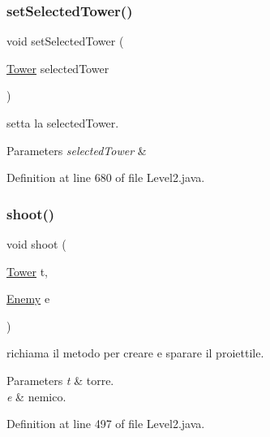 \subsubsection{\texorpdfstring{set\+Selected\+Tower()}{setSelectedTower()}}
{\footnotesize\ttfamily void set\+Selected\+Tower (\begin{DoxyParamCaption}\item[{\hyperlink{classtowers_1_1_tower}{Tower}}]{selected\+Tower }\end{DoxyParamCaption})}



setta la selected\+Tower. 


\begin{DoxyParams}{Parameters}
{\em selected\+Tower} & \\
\hline
\end{DoxyParams}


Definition at line 680 of file Level2.\+java.

\mbox{\label{classscenes_1_1_level2_a200b073564fc341f34b6112718742bae}} 
\subsubsection{\texorpdfstring{shoot()}{shoot()}}
{\footnotesize\ttfamily void shoot (\begin{DoxyParamCaption}\item[{\hyperlink{classtowers_1_1_tower}{Tower}}]{t,  }\item[{\hyperlink{classenemies_1_1_enemy}{Enemy}}]{e }\end{DoxyParamCaption})}



richiama il metodo per creare e sparare il proiettile. 


\begin{DoxyParams}{Parameters}
{\em t} & torre. \\
\hline
{\em e} & nemico. \\
\hline
\end{DoxyParams}


Definition at line 497 of file Level2.\+java.

